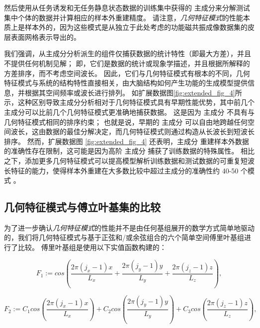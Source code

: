 \documentclass[lang=cn,a4paper,newtx,citestyle=gb7714-2015, bibstyle=gb7714-2015]{elegantpaper}
\begin{document}
然后使用从任务诱发和无任务静息状态数据的训练集中获得的 主成分来分解测试集中个体的数据并计算相应的样本外重建精度。
请注意，\textit{几何特征模式}的性能本质上是样本外的，因为这些模式是从独立于此处考虑的功能磁共振成像数据集的皮层表面网格表示导出的。


我们强调，从主成分分析派生的组件仅捕获数据的统计特性（即最大方差），并且不提供任何机制见解；
即，它们是数据的统计或现象学描述，并且根据所解释的方差排序，而不考虑空间波长。
因此，它们与几何特征模式有根本的不同，几何特征模式与系统的结构特性直接相关，由大脑结构如何产生功能\cite{wang2016brain}的生成模型提供信息，并根据其空间频率或波长进行排列。 
如扩展数据图\ref{fig:extended_fig_4}所示，这种区别导致主成分分析相对于几何特征模式具有早期性能优势，其中前几个主成分可以比前几个几何特征模式更准确地捕获数据。
这是因为 主成分 不具有与几何特征模式相同的排序约束；
也就是说，早期的 主成分 可以自由地跨越任何空间波长，这由数据的最佳分解决定，而几何特征模式则通过构造从长波长到短波长排序。
然而，扩展数据图 \ref{fig:extended_fig_4} 还表明，主成分 重建样本外数据的准确性存在限制，这可能是因为高阶 主成分 捕获了训练数据的特殊属性。
相比之下，添加更多几何特征模式可以提高模型解析训练数据和测试数据的可重复短波长特征的能力，使得样本外重建在大多数比较中超过主成分的准确性约 40-50 个模式 。



\subsection{几何特征模式与傅立叶基集的比较} \label{sec:comparison_fourier}


为了进一步确认\textit{几何特征模式}的性能并不是由任何基组展开的数学方式简单地驱动的，我们将几何特征模式与基于正弦和/或余弦组合的六个简单空间傅里叶基组进行了比较。
傅里叶基组是使用以下实值函数构建的：

\begin{equation}\label{eq:real_functions_1}
	F_1 := cos(
				\frac{2 \pi (j_x - 1) x}{L_x} + 
				\frac{2 \pi (j_y - 1) y}{L_y} + 
				\frac{2 \pi (j_z - 1) z}{L_z}
			  ),
\end{equation}

\begin{equation}\label{eq:real_functions_2}
	F_2 := C_1 cos(
				   \frac{2 \pi (j_x - 1)x}{L_x}
				  ) + 
		   C_2 cos(
		   			\frac{2 \pi (j_y - 1)y}{L_y}
		   		  ) + 
		   C_3 cos(
		   			\frac{2 \pi (j_z - 1)z}{L_z}
		   		  ),
\end{equation}
\end{document}
